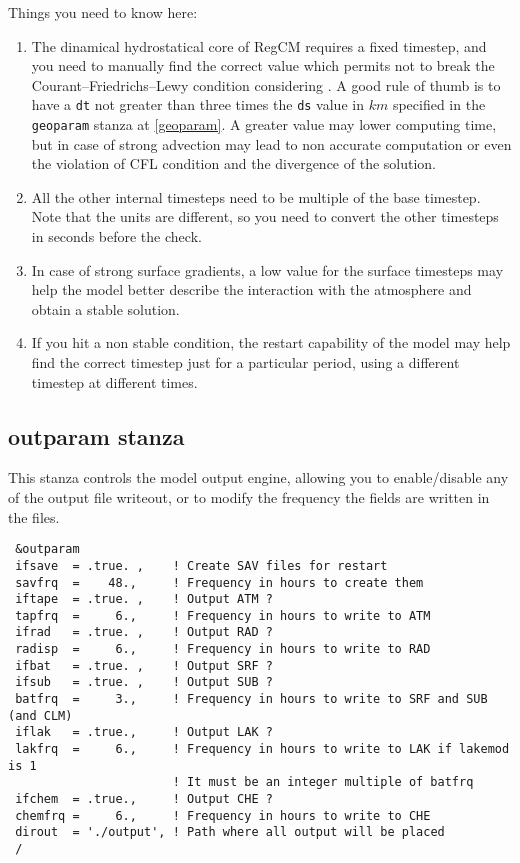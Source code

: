 Things you need to know here:

\begin{enumerate}
\item The dinamical hydrostatical core of RegCM requires a fixed timestep,
and you need to manually find the correct value which permits not to break
the Courant–Friedrichs–Lewy condition considering \cite{CFL}. A good rule
of thumb is to have a \verb=dt= not greater than three times the \verb=ds=
value in $km$ specified in the \verb=geoparam= stanza at \ref{geoparam}.
A greater value may lower computing time, but in case of strong advection
may lead to non accurate computation or even the violation of CFL condition
and the divergence of the solution.
\item All the other internal timesteps need to be multiple of the base timestep.
Note that the units are different, so you need to convert the other timesteps
in seconds before the check.
\item In case of strong surface gradients, a low value for the surface timesteps
may help the model better describe the interaction with the atmosphere and
obtain a stable solution.
\item If you hit a non stable condition, the restart capability of the model
may help find the correct timestep just for a particular period, using a
different timestep at different times.
\end{enumerate}

\subsection{outparam stanza}

This stanza controls the model output engine, allowing you to enable/disable
any of the output file writeout, or to modify the frequency the fields are
written in the files.

{\footnotesize
\begin{Verbatim}
 &outparam
 ifsave  = .true. ,    ! Create SAV files for restart
 savfrq  =    48.,     ! Frequency in hours to create them
 iftape  = .true. ,    ! Output ATM ?
 tapfrq  =     6.,     ! Frequency in hours to write to ATM
 ifrad   = .true. ,    ! Output RAD ?
 radisp  =     6.,     ! Frequency in hours to write to RAD
 ifbat   = .true. ,    ! Output SRF ?
 ifsub   = .true. ,    ! Output SUB ?
 batfrq  =     3.,     ! Frequency in hours to write to SRF and SUB (and CLM)
 iflak   = .true.,     ! Output LAK ?
 lakfrq  =     6.,     ! Frequency in hours to write to LAK if lakemod is 1
                       ! It must be an integer multiple of batfrq
 ifchem  = .true.,     ! Output CHE ?
 chemfrq =     6.,     ! Frequency in hours to write to CHE
 dirout  = './output', ! Path where all output will be placed
 /
\end{Verbatim}
}


